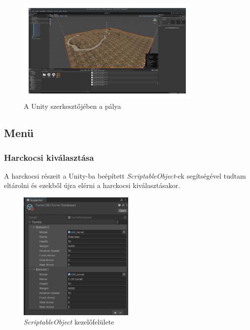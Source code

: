 \documentclass[
]{thesis-ekf}
\theoremstyle{definition}
\theoremstyle{remark}
\begin{document}
\begin{figure}[H]
    \centering
    \includegraphics[width=0.8\textwidth]{screenshots/mapineditor.png}
    \caption{A Unity szerkesztőjében a pálya}
    \label{fig:mapineditor}
\end{figure}

\subsection{Menü}

\subsubsection{Harckocsi kiválasztása}

A harckocsi részeit a Unity-ba beépített \emph{ScriptableObject}-ek segítségével tudtam eltárolni és ezekből újra elérni a harckocsi kiválasztásakor.

\begin{figure}[H]
    \centering
    \includegraphics[width=0.5\textwidth]{screenshots/scriptableobject.png}
    \caption{\emph{ScriptableObject} kezelőfelülete}
    \label{fig:scriptableobject}
\end{figure}
\end{document}
